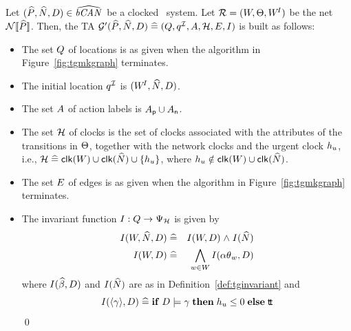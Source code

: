 \begin{definition} \label{def:tgconstructautomaton} 
Let $({\widehat{P}},{\widehat{N}},{D}) \in {\widehat{{\text{\it bCAN\/}_{}}}}$ be a clocked \bcandle\ system. 
Let $\RR = (\W,\T,\WI)$ be the net ${\mathcal{N}[\![{\widehat{P}}]\!]}$. Then, the TA 
$\GrImpl(\PP,\NN,\D) \defs
(\tglocs,\tgiloc,\Actions,\tgclks,\tgedges,\tginv)$ is built as follows:
\begin{itemize}
\item The set $Q$ of locations is as given when the algorithm in 
Figure~\ref{fig:tgmkgraph} terminates.
\item The initial location $\tgiloc$ is $(W^{\!I},{\widehat{N}},{D})$.
\item The set $A$ of action labels is 
${A_{\sf p}} \cup {A_{\sf n}}$.
\item The set $\tgclks$ of clocks is the set of clocks associated with
the attributes of the transitions in $\Theta$, together with the network clocks
and the urgent clock $h_{u}$,
i.e., $\tgclks \defs \clk(\W) \cup \clk(\NN) \cup \{\uclock\}$, where
$h_{u} \notin {\mathop{\sf clk}}(W) \cup {\mathop{\sf clk}}({\widehat{N}})$.
\item The set $E$ of edges is as given when the algorithm in 
Figure~\ref{fig:tgmkgraph} terminates.
\item The invariant function $\tginv : \tglocs \fun \ClockConstraints$ is 
given by
\begin{eqnarray*}
I(W,{\widehat{N}},{D}) & \mathrel{\widehat=} & I(W,{D}) \mathrel{\wedge} I({\widehat{N}}) \\
I(W,{D}) & \mathrel{\widehat=} & \bigwedge_{{w} \in W} I({\alpha\theta}_{w}, {D}) \\
\end{eqnarray*}
where $I({\widehat{\beta}},{D})$ and $I({\widehat{N}})$ are as in Definition~\ref{def:tginvariant} and 
\[ I({\langle \gamma\rangle},{D}) \mathrel{\widehat=}  {\mathbf{if}}\; {D} \models \gamma \mathrel{\mathbf{then}} h_{u} \leq 0 \mathrel{\mathbf{else}} \text{\sf t\!t} \]
\qed
\end{itemize} 
\end{definition}

